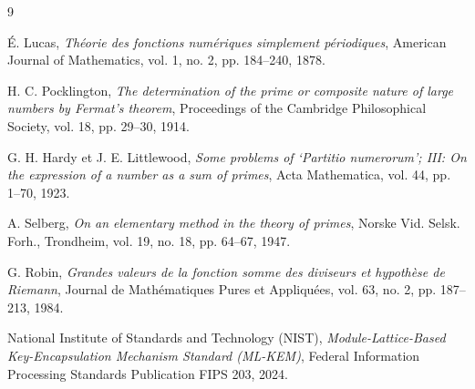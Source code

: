 \documentclass[11pt,a4paper]{article}
\begin{document}
\begin{thebibliography}{9}

É. Lucas, \emph{Théorie des fonctions numériques simplement périodiques}, American Journal of Mathematics, vol. 1, no. 2, pp. 184--240, 1878.

H. C. Pocklington, \emph{The determination of the prime or composite nature of large numbers by Fermat's theorem}, Proceedings of the Cambridge Philosophical Society, vol. 18, pp. 29--30, 1914.

G. H. Hardy et J. E. Littlewood, \emph{Some problems of `Partitio numerorum'; III: On the expression of a number as a sum of primes}, Acta Mathematica, vol. 44, pp. 1--70, 1923.

A. Selberg, \emph{On an elementary method in the theory of primes}, Norske Vid. Selsk. Forh., Trondheim, vol. 19, no. 18, pp. 64--67, 1947.

G. Robin, \emph{Grandes valeurs de la fonction somme des diviseurs et hypothèse de Riemann}, Journal de Mathématiques Pures et Appliquées, vol. 63, no. 2, pp. 187--213, 1984.

National Institute of Standards and Technology (NIST), \emph{Module-Lattice-Based Key-Encapsulation Mechanism Standard (ML-KEM)}, Federal Information Processing Standards Publication FIPS 203, 2024.

\end{thebibliography}
\end{document}
